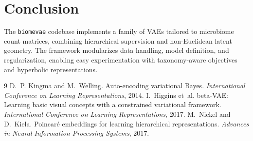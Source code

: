 \documentclass[11pt]{article}
\begin{document}
\section{Conclusion}
The \texttt{biomevae} codebase implements a family of VAEs tailored to microbiome count
matrices, combining hierarchical supervision and non-Euclidean latent geometry. The
framework modularizes data handling, model definition, and regularization, enabling
easy experimentation with taxonomy-aware objectives and hyperbolic representations.
\begin{thebibliography}{9}
D.~P. Kingma and M.~Welling.
\newblock Auto-encoding variational Bayes.
\newblock \emph{International Conference on Learning Representations}, 2014.
I.~Higgins et~al.
\newblock beta-{VAE}: Learning basic visual concepts with a constrained variational framework.
\newblock \emph{International Conference on Learning Representations}, 2017.
M.~Nickel and D.~Kiela.
\newblock Poincar\'e embeddings for learning hierarchical representations.
\newblock \emph{Advances in Neural Information Processing Systems}, 2017.
\end{thebibliography}
\end{document}
